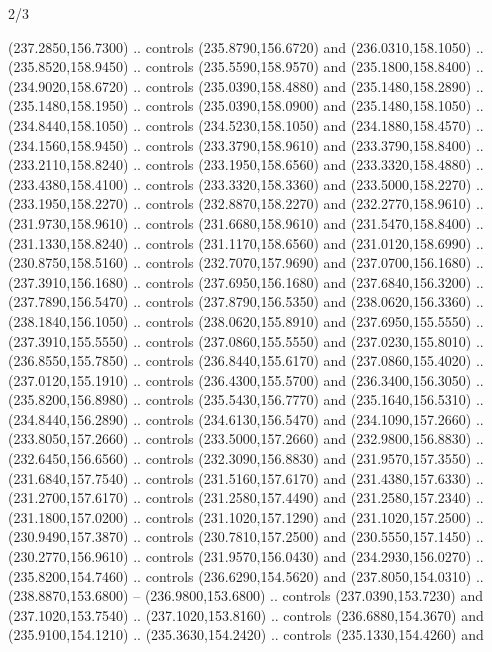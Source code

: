 \begin{flagdescription}{2/3}
\begin{scope}[xshift=0.5\flaglength,yshift=0.5\flagwidth,scale=\flagwidth/259.2]
\begin{scope}[y=0.8pt, x=0.8pt, yscale=-1,shift={(-243,-162)}]
      (237.2850,156.7300) .. controls (235.8790,156.6720) and (236.0310,158.1050) ..
      (235.8520,158.9450) .. controls (235.5590,158.9570) and (235.1800,158.8400) ..
      (234.9020,158.6720) .. controls (235.0390,158.4880) and (235.1480,158.2890) ..
      (235.1480,158.1950) .. controls (235.0390,158.0900) and (235.1480,158.1050) ..
      (234.8440,158.1050) .. controls (234.5230,158.1050) and (234.1880,158.4570) ..
      (234.1560,158.9450) .. controls (233.3790,158.9610) and (233.3790,158.8400) ..
      (233.2110,158.8240) .. controls (233.1950,158.6560) and (233.3320,158.4880) ..
      (233.4380,158.4100) .. controls (233.3320,158.3360) and (233.5000,158.2270) ..
      (233.1950,158.2270) .. controls (232.8870,158.2270) and (232.2770,158.9610) ..
      (231.9730,158.9610) .. controls (231.6680,158.9610) and (231.5470,158.8400) ..
      (231.1330,158.8240) .. controls (231.1170,158.6560) and (231.0120,158.6990) ..
      (230.8750,158.5160) .. controls (232.7070,157.9690) and (237.0700,156.1680) ..
      (237.3910,156.1680) .. controls (237.6950,156.1680) and (237.6840,156.3200) ..
      (237.7890,156.5470) .. controls (237.8790,156.5350) and (238.0620,156.3360) ..
      (238.1840,156.1050) .. controls (238.0620,155.8910) and (237.6950,155.5550) ..
      (237.3910,155.5550) .. controls (237.0860,155.5550) and (237.0230,155.8010) ..
      (236.8550,155.7850) .. controls (236.8440,155.6170) and (237.0860,155.4020) ..
      (237.0120,155.1910) .. controls (236.4300,155.5700) and (236.3400,156.3050) ..
      (235.8200,156.8980) .. controls (235.5430,156.7770) and (235.1640,156.5310) ..
      (234.8440,156.2890) .. controls (234.6130,156.5470) and (234.1090,157.2660) ..
      (233.8050,157.2660) .. controls (233.5000,157.2660) and (232.9800,156.8830) ..
      (232.6450,156.6560) .. controls (232.3090,156.8830) and (231.9570,157.3550) ..
      (231.6840,157.7540) .. controls (231.5160,157.6170) and (231.4380,157.6330) ..
      (231.2700,157.6170) .. controls (231.2580,157.4490) and (231.2580,157.2340) ..
      (231.1800,157.0200) .. controls (231.1020,157.1290) and (231.1020,157.2500) ..
      (230.9490,157.3870) .. controls (230.7810,157.2500) and (230.5550,157.1450) ..
      (230.2770,156.9610) .. controls (231.9570,156.0430) and (234.2930,156.0270) ..
      (235.8200,154.7460) .. controls (236.6290,154.5620) and (237.8050,154.0310) ..
      (238.8870,153.6800) -- (236.9800,153.6800) .. controls (237.0390,153.7230) and
      (237.1020,153.7540) .. (237.1020,153.8160) .. controls (236.6880,154.3670) and
      (235.9100,154.1210) .. (235.3630,154.2420) .. controls (235.1330,154.4260) and

\end{scope}
\end{scope}
\end{flagdescription}
